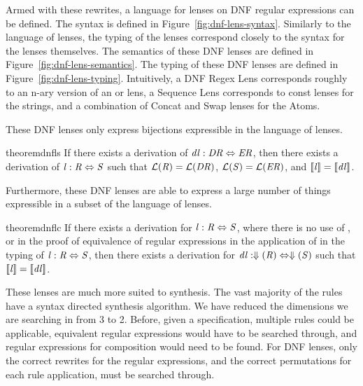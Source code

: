 \documentclass[numbers]{sigplanconf}
\begin{document}
Armed with these rewrites, a language for lenses on DNF regular
expressions can be defined.
The syntax is defined in Figure~\ref{fig:dnf-lens-syntax}.
Similarly to the language of lenses, the typing of the lenses
correspond closely to the syntax for the lenses themselves.
The semantics of these DNF lenses are defined in
Figure~\ref{fig:dnf-lens-semantics}.
The typing of these DNF lenses are defined in Figure~\ref{fig:dnf-lens-typing}.
Intuitively, a DNF Regex Lens corresponds roughly to an n-ary version of an or lens,
a Sequence Lens corresponds to const lenses for the strings, and a combination of
Concat and Swap lenses for the Atoms.

These DNF lenses only express bijections expressible in the language of lenses.
\begin{restatable}{theorem}{dnfls}
\label{thm:dnfls}
If there exists a derivation of $\mathit{dl} : \mathit{DR} \Leftrightarrow \mathit{ER}$,
then there exists a derivation of $\mathit{l} : \mathit{R} \Leftrightarrow \mathit{S}$ such that
$\mathcal{L}(\mathit{R})=\mathcal{L}(\mathit{DR})$,
$\mathcal{L}(\mathit{S})=\mathcal{L}(\mathit{ER})$, and
$[ \! [\mathit{l}] \! ]=[ \! [\mathit{dl}] \! ]$.
\end{restatable}

Furthermore, these DNF lenses are able to express a large number of things
expressible in a subset of the language of lenses.
\begin{restatable}{theorem}{dnflc}
\label{thm:dnflc}
If there exists a derivation for $\mathit{l} : \mathit{R} \Leftrightarrow
\mathit{S}$,
where there is no use of \DicyclicityRule{}, or \SumstarRule{} in the
proof of equivalence of regular expressions in the application of
\RewriteRegexLensRule{} in the typing of
$\mathit{l} : \mathit{R} \Leftrightarrow \mathit{S}$,
then there exists a derivation for
$\mathit{dl} : \Downarrow(\mathit{R}) \Leftrightarrow \Downarrow(\mathit{S})$
such that $[ \! [\mathit{l}] \! ]=[ \! [\mathit{dl}] \! ]$.
\end{restatable}


These lenses are much more suited to synthesis.
The vast majority of the rules have a syntax directed synthesis algorithm.
We have reduced the dimensions we are searching in from 3 to 2.  Before, given a
specification, multiple rules could be applicable, equivalent regular
expressions would have to be searched through, and regular expressions for
composition would need to be found.
For DNF lenses, only the correct rewrites for the regular expressions, and the
correct permutations for each rule application, must be searched through.
\end{document}
